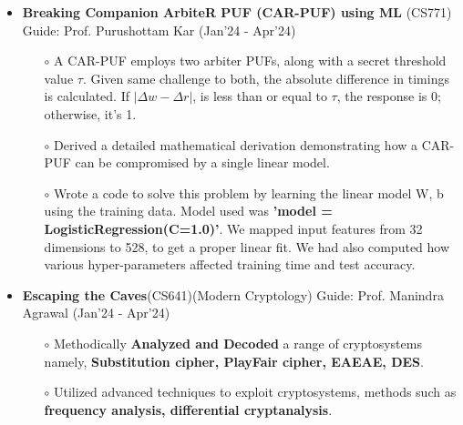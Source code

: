 \documentclass[10.8pt, a4paper]{extarticle}
\begin{document}
\begin{itemize}
  \item \textbf{Breaking Companion ArbiteR PUF (CAR-PUF) using ML} (CS771) Guide: Prof. Purushottam Kar \href{https://github.com/souvikcseiitk/Companion-Arbiter-PUF-broken-by-ML-attacks}{\faGithub{}} \hfill(Jan'24 - Apr'24)
	\\[-0.6cm]
	\begin{itemize}
 
         \item[$\circ$] A CAR-PUF employs two arbiter PUFs, along with a secret threshold value $\tau$. Given same challenge to both, the absolute difference in timings is calculated. If $|\Delta w - \Delta r|$, is less than or equal to $\tau$, the response is 0; otherwise, it's 1.
 \\[-0.6cm]
         
        \item[$\circ$] Derived a detailed mathematical derivation demonstrating how a CAR-PUF can be compromised by a single linear model. \\[-0.6cm]

         \item[$\circ$] Wrote a code to solve this problem by learning the linear model W, b using the training data. Model used was \textbf{'model = LogisticRegression(C=1.0)'}. We mapped input features from 32 dimensions to 528, to get a proper linear fit. We had also computed how various hyper-parameters affected training time and test accuracy.
 
	

	\end{itemize}
\vspace{2pt}

\item \textbf{Escaping the Caves}(CS641)(Modern Cryptology) Guide: Prof. Manindra Agrawal \href{https://github.com/souvikcseiitk/Escaping-the-Caves}{\faGithub{}} \hfill(Jan'24 - Apr'24)
    \\[-0.6cm]
	\begin{itemize}
	      \item [$\circ$] Methodically \textbf {Analyzed and Decoded} a range of cryptosystems namely, \textbf {Substitution cipher, PlayFair cipher, EAEAE,  DES}.\\[-0.6cm]
	      
	      \item [$\circ$] Utilized advanced techniques to exploit cryptosystems, methods such as\textbf { frequency analysis, differential cryptanalysis}.\\[-0.6cm]
	\end{itemize}
\end{itemize}
\vspace{2pt}
\end{document}
